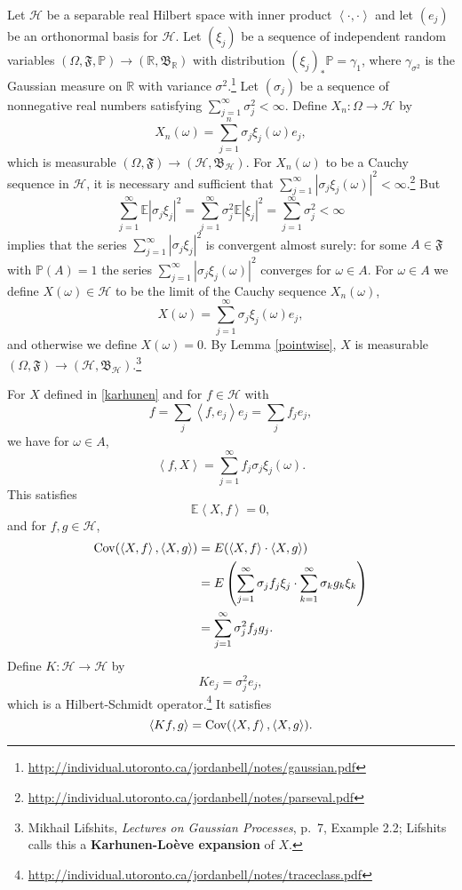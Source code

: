 \documentclass{article}
\newcommand{\inner}[2]{\left\langle #1, #2 \right\rangle}
\newcommand{\Cov}{\ensuremath\mathrm{Cov}}
\theoremstyle{definition}
\begin{document}
Let $\mathscr{H}$ be a separable real Hilbert space with inner product $\inner{\cdot}{\cdot}$
and
let $(e_j)$ be an orthonormal basis for $\mathscr{H}$. Let
$(\xi_j)$ be a sequence of independent random variables
$(\Omega,\mathfrak{F},\mathbb{P}) \to (\mathbb{R},\mathfrak{B}_{\mathbb{R}})$ with distribution
$(\xi_j)_*\mathbb{P}=\gamma_1$, where $\gamma_{\sigma^2}$ is the  Gaussian measure on $\mathbb{R}$ with variance $\sigma^2$.\footnote{\url{http://individual.utoronto.ca/jordanbell/notes/gaussian.pdf}}
Let $(\sigma_j)$ be a sequence of nonnegative real numbers satisfying $\sum_{j=1}^\infty \sigma_j^2<\infty$.
Define $X_n:\Omega \to \mathscr{H}$ by
\[
X_n(\omega) = \sum_{j=1}^n \sigma_j \xi_j(\omega) e_j,
\]
which is measurable $(\Omega,\mathfrak{F}) \to (\mathscr{H},\mathfrak{B}_{\mathscr{H}})$. 
For $X_n(\omega)$ to be a Cauchy sequence in $\mathscr{H}$, 
it is necessary and sufficient that
$\sum_{j=1}^\infty |\sigma_j \xi_j(\omega)|^2<\infty$.\footnote{\url{http://individual.utoronto.ca/jordanbell/notes/parseval.pdf}}
But
\[
\sum_{j=1}^\infty \mathbb{E}|\sigma_j \xi_j|^2 = \sum_{j=1}^\infty \sigma_j^2 \mathbb{E}|\xi_j|^2 = 
\sum_{j=1}^\infty \sigma_j^2<\infty
\]
 implies that the series $\sum_{j=1}^\infty |\sigma_j \xi_j|^2$ is convergent almost surely:
  for some $A \in \mathfrak{F}$ with $\mathbb{P}(A)=1$ the series $\sum_{j=1}^\infty |\sigma_j \xi_j(\omega)|^2$ converges for $\omega \in A$.
For  $\omega \in A$ we define $X(\omega) \in 
\mathscr{H}$ to be the limit of the Cauchy sequence $X_n(\omega)$,
\begin{equation}
X(\omega) = \sum_{j=1}^\infty \sigma_j \xi_j(\omega) e_j,
\label{karhunen}
\end{equation}
and otherwise we define $X(\omega)=0$.
By Lemma \ref{pointwise}, $X$ is measurable $(\Omega,\mathfrak{F}) \to (\mathscr{H},\mathfrak{B}_{\mathscr{H}})$.\footnote{Mikhail Lifshits, {\em Lectures on Gaussian Processes},
p.~7, Example 2.2; Lifshits calls this a \textbf{Karhunen-Lo\`eve expansion} of $X$.}


For $X$ defined in \eqref{karhunen} and for $f \in \mathscr{H}$ with
\[
f = \sum_j \inner{f}{e_j} e_j = \sum_j f_j e_j,
\]
we have for $\omega \in A$,
\[
\inner{f}{X} = \sum_{j=1}^\infty f_j \sigma_j \xi_j(\omega).
\]
This satisfies
\[
\mathbb{E}\inner{X}{f} = 0,
\]
and
for $f,g \in \mathscr{H}$,
\begin{align*}
\Cov(\inner{X}{f},\inner{X}{g})&=E(\inner{X}{f} \cdot \inner{X}{g})\\
&=E\left( \sum_{j=1}^\infty \sigma_j f_j \xi_j \cdot \sum_{k=1}^\infty \sigma_k g_k \xi_k\right)\\
&=\sum_{j=1}^\infty \sigma_j^2 f_j g_j.
\end{align*}
Define $K:\mathscr{H} \to \mathscr{H}$ by
\[
Ke_j = \sigma_j^2 e_j,
\]
which is a Hilbert-Schmidt operator.\footnote{\url{http://individual.utoronto.ca/jordanbell/notes/traceclass.pdf}}
It satisfies
\[
\inner{Kf}{g} = \Cov(\inner{X}{f},\inner{X}{g}).
\]
\end{document}
